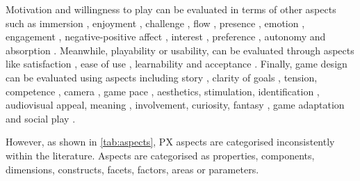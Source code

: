 Motivation and willingness to play can be evaluated in terms of other aspects such as immersion \autocite{Lapas2015,Nacke2009,VandenAbeele2016,Wiemeyer2016,Nijhar2012,Sanchez2009,Desurvire2009,Nijholt2008}, enjoyment \autocite{Ho2017,Li2016,VandenAbeele2016,Zhao2016,Li2006,Berkovsky2010}, challenge \autocite{Moosajee,Nacke2009,VandenAbeele2016,Wiemeyer2016,Desurvire2009}, flow \autocite{Lapas2015,Bernhaupt2015,Nacke2009,Wiemeyer2016,Nijholt2008}, presence \autocite{Lapas2015,Mader2012,Ho2017,Wiemeyer2016}, 
emotion \autocite{Bernhaupt2015,Sanchez2009,Wiemeyer2016}, engagement \autocite{Yanez-Gomez2017,Wiemeyer2016}, negative-positive affect \autocite{Nacke2009}, interest \autocite{VandenAbeele2016}, preference \autocite{Zhao2016}, autonomy \autocite{Wiemeyer2016,VandenAbeele2016} and 
absorption \autocite{Lapas2015}. Meanwhile, playability or usability, can be evaluated through aspects like satisfaction \autocite{Yanez-Gomez2017,Zhao2016,Sanchez2009}, ease of use \autocite{Moosajee,VandenAbeele2016,Cameirao2010}, learnability \autocite{GonzalezSanchez2009,Desurvire2009} and
acceptance \autocite{Yanez-Gomez2017}. Finally, game design can be evaluated using aspects including story \autocite{Moosajee,Desurvire2009}, clarity of goals \autocite{VandenAbeele2016,Desurvire2009}, tension, competence \autocite{Wiemeyer2016,Nacke2009}, camera \autocite{Moosajee},
game pace \autocite{Moosajee,Desurvire2009}, aesthetics, stimulation, identification \autocite{Bernhaupt2015}, audiovisual appeal, meaning \autocite{VandenAbeele2016}, involvement, curiosity, fantasy \autocite{Wiemeyer2016}, game adaptation \autocite{Wiemeyer2015,Ni2014,Cameirao2010,Nijholt2008} and social play \autocite{Wiemeyer2015,Sanchez2009,Yanez-Gomez2017,Lapas2015}.

However, as shown in \autoref{tab:aspects}, \ac{PX} aspects are categorised inconsistently within the literature. Aspects are categorised as properties, components, dimensions, constructs, facets, factors, areas or parameters.

